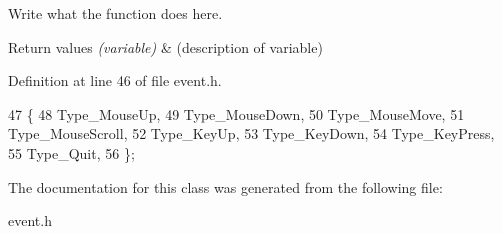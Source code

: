 Write what the function does here. 


\begin{DoxyRetVals}{Return values}
{\em (variable)} & (description of variable) \\
\hline
\end{DoxyRetVals}


Definition at line 46 of file event.\+h.


\begin{DoxyCode}
47         \{
48             Type\_MouseUp,
49             Type\_MouseDown,
50             Type\_MouseMove,
51             Type\_MouseScroll,
52             Type\_KeyUp,
53             Type\_KeyDown,
54             Type\_KeyPress,
55             Type\_Quit,
56         \};
\end{DoxyCode}


The documentation for this class was generated from the following file\+:\begin{DoxyCompactItemize}
\item 
event.\+h\end{DoxyCompactItemize}
